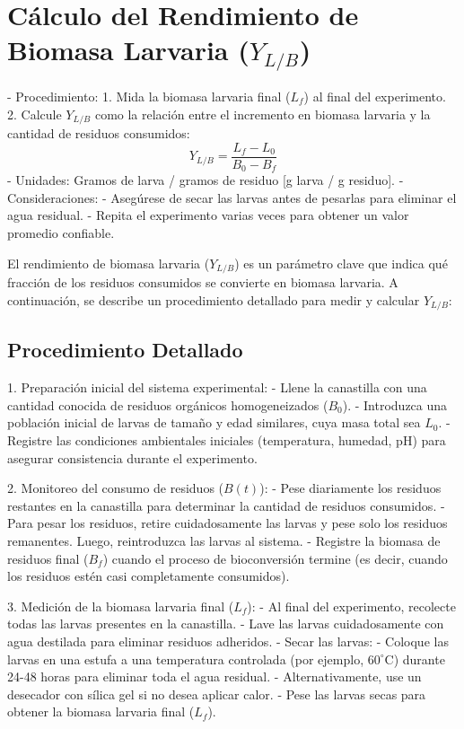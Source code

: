 \documentclass[12pt]{article}
\begin{document}
\section{Cálculo del Rendimiento de Biomasa Larvaria ($Y_{L/B}$)}
- Procedimiento:
  1. Mida la biomasa larvaria final ($L_f$) al final del experimento.
  2. Calcule $Y_{L/B}$ como la relación entre el incremento en biomasa larvaria y la cantidad de residuos consumidos:
     \[
     Y_{L/B} = \frac{L_f - L_0}{B_0 - B_f}
     \]
- Unidades: Gramos de larva / gramos de residuo [g larva / g residuo].
- Consideraciones:
  - Asegúrese de secar las larvas antes de pesarlas para eliminar el agua residual.
  - Repita el experimento varias veces para obtener un valor promedio confiable.

El rendimiento de biomasa larvaria ($Y_{L/B}$) es un parámetro clave que indica qué fracción de los residuos consumidos se convierte en biomasa larvaria. A continuación, se describe un procedimiento detallado para medir y calcular $Y_{L/B}$:

\subsection{Procedimiento Detallado}

1. Preparación inicial del sistema experimental:
   - Llene la canastilla con una cantidad conocida de residuos orgánicos homogeneizados ($B_0$).
   - Introduzca una población inicial de larvas de tamaño y edad similares, cuya masa total sea $L_0$.
   - Registre las condiciones ambientales iniciales (temperatura, humedad, pH) para asegurar consistencia durante el experimento.

2. Monitoreo del consumo de residuos ($B(t)$):
   - Pese diariamente los residuos restantes en la canastilla para determinar la cantidad de residuos consumidos.
   - Para pesar los residuos, retire cuidadosamente las larvas y pese solo los residuos remanentes. Luego, reintroduzca las larvas al sistema.
   - Registre la biomasa de residuos final ($B_f$) cuando el proceso de bioconversión termine (es decir, cuando los residuos estén casi completamente consumidos).

3. Medición de la biomasa larvaria final ($L_f$):
   - Al final del experimento, recolecte todas las larvas presentes en la canastilla.
   - Lave las larvas cuidadosamente con agua destilada para eliminar residuos adheridos.
   - Secar las larvas:
     - Coloque las larvas en una estufa a una temperatura controlada (por ejemplo, $60^\circ \text{C}$) durante 24-48 horas para eliminar toda el agua residual.
     - Alternativamente, use un desecador con sílica gel si no desea aplicar calor.
   - Pese las larvas secas para obtener la biomasa larvaria final ($L_f$).
\end{document}
